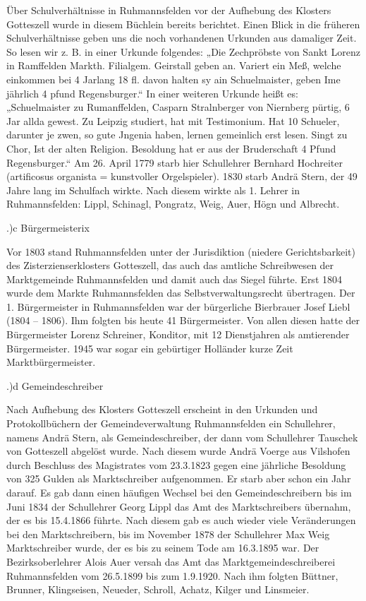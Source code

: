 Über Schulverhältnisse in Ruhmannsfelden vor der Aufhebung des Klosters
Gotteszell wurde in diesem Büchlein bereits berichtet. Einen Blick in die
früheren Schulverhältnisse geben uns die noch vorhandenen Urkunden aus damaliger
Zeit. So lesen wir z. B. in einer Urkunde folgendes: „Die Zechpröbste von Sankt
Lorenz in Ramffelden Markth. Filialgem. Geirstall geben an. Variert ein Meß,
welche einkommen bei 4 Jarlang 18 fl. davon halten sy ain Schuelmaister, geben
Ime jährlich 4 pfund Regensburger.“ In einer weiteren Urkunde heißt es:
„Schuelmaister zu Rumanffelden, Casparn Stralnberger von Niernberg pürtig, 6 Jar
allda gewest. Zu Leipzig studiert, hat mit Testimonium. Hat 10 Schueler,
darunter je zwen, so gute Jngenia haben, lernen gemeinlich erst lesen. Singt zu
Chor, Ist der alten Religion. Besoldung hat er aus der Bruderschaft 4 Pfund
Regensburger.“ Am 26. April 1779 starb hier Schullehrer Bernhard Hochreiter
(artificosus organista = kunstvoller Orgelspieler). 1830 starb Andrä Stern, der
49 Jahre lang im Schulfach wirkte. Nach diesem wirkte als 1. Lehrer in
Ruhmannsfelden: Lippl, Schinagl, Pongratz, Weig, Auer, Högn und Albrecht.

.)c Bürgermeisterix

Vor 1803 stand Ruhmannsfelden unter der Jurisdiktion (niedere Gerichtsbarkeit)
des Zisterzienserklosters Gotteszell, das auch das amtliche Schreibwesen der
Marktgemeinde Ruhmannsfelden und damit auch das Siegel führte. Erst 1804 wurde
dem Markte Ruhmannsfelden das Selbstverwaltungsrecht übertragen. Der 1.
Bürgermeister in Ruhmannsfelden war der bürgerliche Bierbrauer Josef Liebl (1804
– 1806). Ihm folgten bis heute 41 Bürgermeister. Von allen diesen hatte der
Bürgermeister Lorenz Schreiner, Konditor, mit 12 Dienstjahren als amtierender
Bürgermeister. 1945 war sogar ein gebürtiger Holländer kurze Zeit
Marktbürgermeister.

.)d Gemeindeschreiber

Nach Aufhebung des Klosters Gotteszell erscheint in den Urkunden und
Protokollbüchern der Gemeindeverwaltung Ruhmannsfelden ein Schullehrer, namens
Andrä Stern, als Gemeindeschreiber, der dann vom Schullehrer Tauschek von
Gotteszell abgelöst wurde. Nach diesem wurde Andrä Voerge aus Vilshofen durch
Beschluss des Magistrates vom 23.3.1823 gegen eine jährliche Besoldung von 325
Gulden als Marktschreiber aufgenommen. Er starb aber schon ein Jahr darauf. Es
gab dann einen häufigen Wechsel bei den Gemeindeschreibern bis im Juni 1834 der
Schullehrer Georg Lippl das Amt des Marktschreibers übernahm, der es bis
15.4.1866 führte. Nach diesem gab es auch wieder viele Veränderungen bei den
Marktschreibern, bis im November 1878 der Schullehrer Max Weig Marktschreiber
wurde, der es bis zu seinem Tode am 16.3.1895 war. Der Bezirksoberlehrer Alois
Auer versah das Amt das Marktgemeindeschreiberei Ruhmannsfelden vom 26.5.1899
bis zum 1.9.1920. Nach ihm folgten Büttner, Brunner, Klingseisen, Neueder,
Schroll, Achatz, Kilger und Linsmeier.

